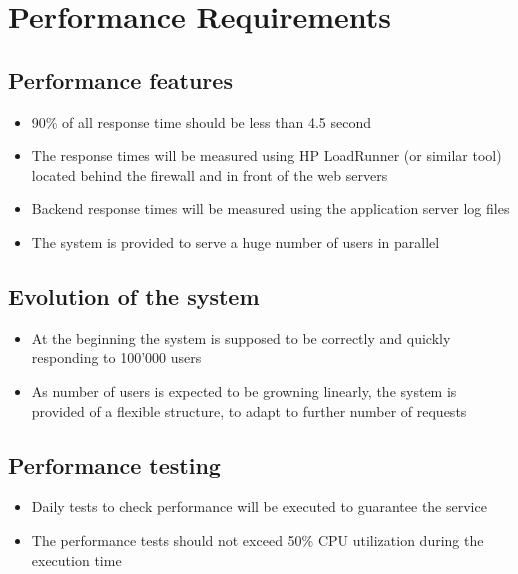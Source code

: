 \section{Performance Requirements}

\subsection{Performance features}
\begin{itemize}
    \item 90\% of all response time should be less than 4.5 second
    \item The response times will be measured using HP LoadRunner (or similar tool) located behind the firewall and in front of the web servers
    \item Backend response times will be measured using the application server log files
    \item The system is provided to serve a huge number of users in parallel
\end{itemize}

\subsection{Evolution of the system}
\begin{itemize}
    \item At the beginning the system is supposed to be correctly and quickly responding to 100'000 users
    \item As number of users is expected to be growning linearly, the system is provided of a flexible structure, to adapt to further number of requests
\end{itemize}

\subsection{Performance testing}
\begin{itemize}
    \item Daily tests to check performance will be executed to guarantee the service
    \item The performance tests should not exceed 50\% CPU utilization during the execution time
\end{itemize}
